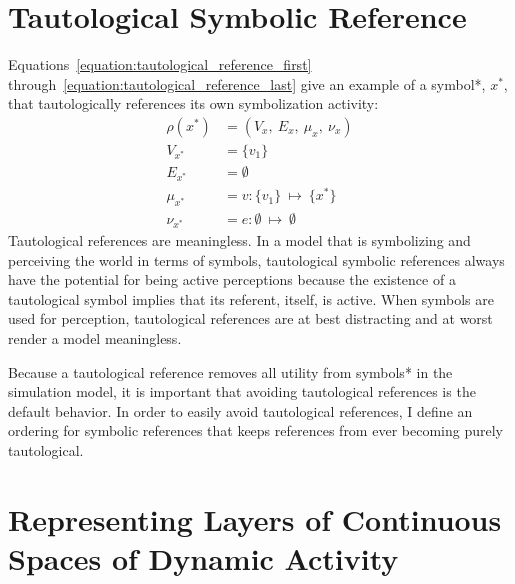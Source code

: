 \section{Tautological Symbolic Reference}

{\mbox{Equations~\ref{equation:tautological_reference_first}}}
{\mbox{through~\ref{equation:tautological_reference_last}}} give an
example of a symbol*, $x^*$, that tautologically references its own
symbolization activity:
\begin{align}
\label{equation:tautological_reference_first}
\rho(x^*) &= (V_x, ~E_x, ~\mu_x, ~\nu_x) \\
 V_{x^*}   &= \{v_1\} \\
 E_{x^*}   &= \emptyset \\
 \mu_{x^*} &= v : \{v_1\} ~{\mapsto}~ \{x^*\} \\
\label{equation:tautological_reference_last}
            \nu_{x^*} &= e : \emptyset ~{\mapsto}~ \emptyset
\end{align}
Tautological references are meaningless.  In a model that is
symbolizing and perceiving the world in terms of symbols, tautological
symbolic references always have the potential for being active
perceptions because the existence of a tautological symbol implies
that its referent, itself, is active.  When symbols are used for
perception, tautological references are at best distracting and at
worst render a model meaningless.

Because a tautological reference removes all utility from symbols* in
the simulation model, it is important that avoiding tautological
references is the default behavior.  In order to easily avoid
tautological references, I define an ordering for symbolic references
that keeps references from ever becoming purely tautological.

\section{Representing Layers of Continuous Spaces of Dynamic Activity}

